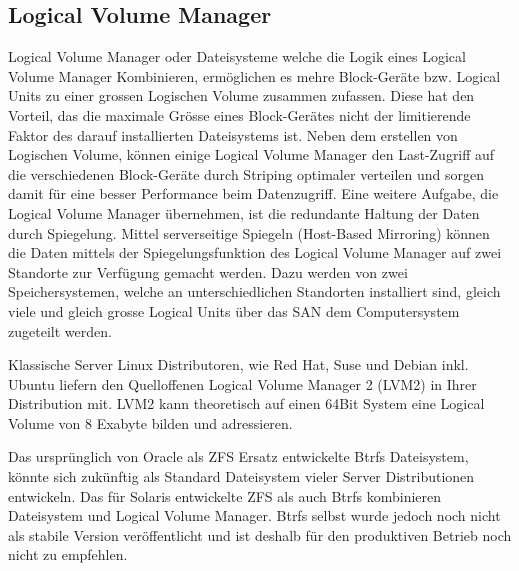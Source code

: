 \subsection{Logical Volume Manager}
Logical Volume Manager oder Dateisysteme welche die Logik eines Logical Volume Manager Kombinieren, ermöglichen es mehre Block-Geräte bzw. Logical Units zu einer grossen Logischen Volume zusammen zufassen. Diese hat den Vorteil, das die maximale Grösse eines Block-Gerätes nicht der limitierende Faktor des darauf installierten Dateisystems ist. Neben dem erstellen von Logischen Volume, können einige Logical Volume Manager den Last-Zugriff auf die verschiedenen Block-Geräte durch Striping optimaler verteilen und sorgen damit für eine besser Performance beim Datenzugriff. Eine weitere Aufgabe, die Logical Volume Manager übernehmen, ist die redundante Haltung der Daten durch Spiegelung. Mittel serverseitige Spiegeln (Host-Based Mirroring) können die Daten mittels der Spiegelungsfunktion des Logical Volume Manager auf zwei Standorte zur Verfügung gemacht werden. Dazu werden von zwei Speichersystemen, welche an unterschiedlichen Standorten installiert sind, gleich viele und gleich grosse Logical Units über das SAN dem Computersystem zugeteilt werden.

Klassische Server Linux Distributoren, wie Red Hat, Suse und Debian inkl. Ubuntu liefern den Quelloffenen Logical Volume Manager 2 (LVM2) in Ihrer Distribution mit. LVM2 kann theoretisch auf einen 64Bit System eine Logical Volume von 8 Exabyte bilden und adressieren.\cite{Levine2009}

Das ursprünglich von Oracle als ZFS Ersatz entwickelte Btrfs Dateisystem, könnte sich zukünftig als Standard Dateisystem vieler Server Distributionen entwickeln. Das für Solaris entwickelte ZFS als auch Btrfs kombinieren Dateisystem und Logical Volume Manager. Btrfs selbst wurde jedoch noch nicht als stabile Version veröffentlicht und ist deshalb für den produktiven Betrieb noch nicht zu empfehlen.\cite{Redler2011}


